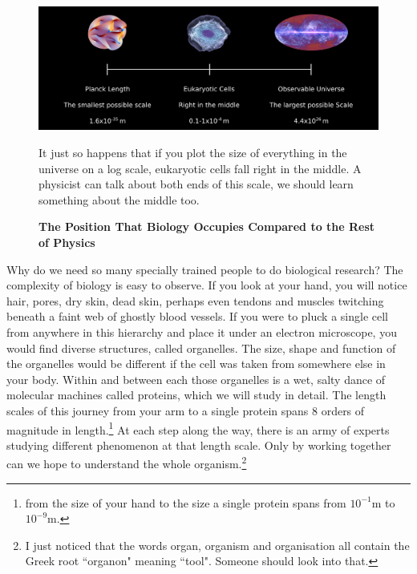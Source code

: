 \begin{figure}
	\begin{center}
		\includegraphics[width=1.0\textwidth]{figures/scales.png}
	\end{center}
	\captionsetup{singlelinecheck = false, justification=raggedright}
	\caption[The Position That Biology Occupies Compared to the Rest of Physics] {\textbf{The Position That Biology Occupies Compared to the Rest of Physics}}{It just so happens that if you plot the size of everything  in the universe on a log scale, eukaryotic cells fall right in the middle. A physicist can talk about both ends of this scale, we should learn something about the middle too.}
	\label{length_scales}
\end{figure}

Why do we need so many specially trained people to do biological research? The complexity of biology is easy to observe. If you look at your hand, you will notice hair, pores, dry skin, dead skin, perhaps even tendons and muscles twitching beneath a faint web of ghostly blood vessels. If you were to pluck a single cell from anywhere in this hierarchy and place it under an electron microscope, you would find diverse structures, called organelles. The size, shape and function of the organelles would be different if the cell was taken from somewhere else in your body. Within and between each those organelles is a wet, salty dance of molecular machines called proteins, which we will study in detail. The length scales of this journey from your arm to a single protein spans 8 orders of magnitude in length.\footnote{ from the size of your hand to the size a single protein spans from $10^{-1}$m  to $10^{-9}$m.} At each step along the way, there is an army of experts studying different phenomenon at that length scale. Only by working together can we hope to understand the whole organism.\footnote{I just noticed that the words organ, organism and organisation all contain the Greek root ``organon" meaning ``tool". Someone should look into that. }

